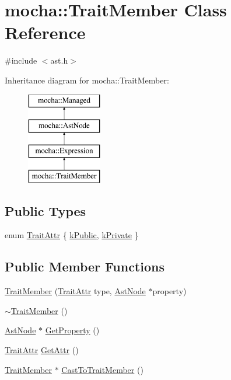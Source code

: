 \hypertarget{classmocha_1_1_trait_member}{
\section{mocha::TraitMember Class Reference}
\label{classmocha_1_1_trait_member}
}


{\ttfamily \#include $<$ast.h$>$}

Inheritance diagram for mocha::TraitMember:\begin{figure}[H]
\begin{center}
\leavevmode
\includegraphics[height=4.000000cm]{classmocha_1_1_trait_member}
\end{center}
\end{figure}
\subsection*{Public Types}
\begin{DoxyCompactItemize}
\item 
enum \hyperlink{classmocha_1_1_trait_member_a3186269fa0b78f72814a117018a7b40d}{TraitAttr} \{ \hyperlink{classmocha_1_1_trait_member_a3186269fa0b78f72814a117018a7b40da030ec8908e9db3e3149097ca8b84a234}{kPublic}, 
\hyperlink{classmocha_1_1_trait_member_a3186269fa0b78f72814a117018a7b40da1ab6f9a89197af4bea6cb9411e2201a4}{kPrivate}
 \}
\end{DoxyCompactItemize}
\subsection*{Public Member Functions}
\begin{DoxyCompactItemize}
\item 
\hyperlink{classmocha_1_1_trait_member_a173e39893ee40355712d2638342a0f2a}{TraitMember} (\hyperlink{classmocha_1_1_trait_member_a3186269fa0b78f72814a117018a7b40d}{TraitAttr} type, \hyperlink{classmocha_1_1_ast_node}{AstNode} $\ast$property)
\item 
\hyperlink{classmocha_1_1_trait_member_a8dc158070569df9c18c6316523f0aa7d}{$\sim$TraitMember} ()
\item 
\hyperlink{classmocha_1_1_ast_node}{AstNode} $\ast$ \hyperlink{classmocha_1_1_trait_member_a10cb950bac544a2fae3a845ec37e56c6}{GetProperty} ()
\item 
\hyperlink{classmocha_1_1_trait_member_a3186269fa0b78f72814a117018a7b40d}{TraitAttr} \hyperlink{classmocha_1_1_trait_member_a7d2059ade5e23676a134e8a860b04e43}{GetAttr} ()
\item 
\hyperlink{classmocha_1_1_trait_member}{TraitMember} $\ast$ \hyperlink{classmocha_1_1_trait_member_a08a942200584355364e078d79d66dde6}{CastToTraitMember} ()
\end{DoxyCompactItemize}
